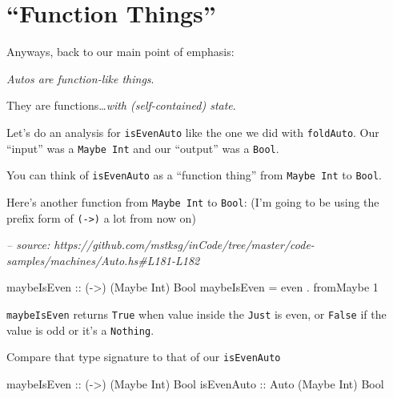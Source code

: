 \documentclass[]{article}
\newenvironment{Shaded}{}{}
\newcommand{\CommentTok}[1]{\textcolor[rgb]{0.38,0.63,0.69}{\textit{#1}}}
\newcommand{\DataTypeTok}[1]{\textcolor[rgb]{0.56,0.13,0.00}{#1}}
\newcommand{\DecValTok}[1]{\textcolor[rgb]{0.25,0.63,0.44}{#1}}
\newcommand{\FunctionTok}[1]{\textcolor[rgb]{0.02,0.16,0.49}{#1}}
\newcommand{\NormalTok}[1]{#1}
\newcommand{\OtherTok}[1]{\textcolor[rgb]{0.00,0.44,0.13}{#1}}
\begin{document}
\hypertarget{function-things}{%
\section{``Function Things''}\label{function-things}}

Anyways, back to our main point of emphasis:

\emph{Autos are function-like things}.

They are functions\ldots{}\emph{with (self-contained) state}.

Let's do an analysis for \texttt{isEvenAuto} like the one we did with
\texttt{foldAuto}. Our ``input'' was a \texttt{Maybe\ Int} and our ``output''
was a \texttt{Bool}.

You can think of \texttt{isEvenAuto} as a ``function thing'' from
\texttt{Maybe\ Int} to \texttt{Bool}.

Here's another function from \texttt{Maybe\ Int} to \texttt{Bool}: (I'm going to
be using the prefix form of \texttt{(-\textgreater{})} a lot from now on)

\begin{Shaded}
\begin{Highlighting}[]
\CommentTok{-- source: https://github.com/mstksg/inCode/tree/master/code-samples/machines/Auto.hs#L181-L182}

\OtherTok{maybeIsEven ::}\NormalTok{ (}\OtherTok{->}\NormalTok{) (}\DataTypeTok{Maybe} \DataTypeTok{Int}\NormalTok{) }\DataTypeTok{Bool}
\NormalTok{maybeIsEven }\FunctionTok{=}\NormalTok{ even }\FunctionTok{.}\NormalTok{ fromMaybe }\DecValTok{1}
\end{Highlighting}
\end{Shaded}

\texttt{maybeIsEven} returns \texttt{True} when value inside the \texttt{Just}
is even, or \texttt{False} if the value is odd or it's a \texttt{Nothing}.

Compare that type signature to that of our \texttt{isEvenAuto}

\begin{Shaded}
\begin{Highlighting}[]
\OtherTok{maybeIsEven ::}\NormalTok{ (}\OtherTok{->}\NormalTok{) (}\DataTypeTok{Maybe} \DataTypeTok{Int}\NormalTok{) }\DataTypeTok{Bool}
\OtherTok{isEvenAuto  ::} \DataTypeTok{Auto}\NormalTok{ (}\DataTypeTok{Maybe} \DataTypeTok{Int}\NormalTok{) }\DataTypeTok{Bool}
\end{Highlighting}
\end{Shaded}
\end{document}
